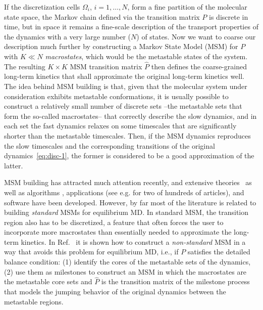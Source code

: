 \documentclass[journal=jctcce,manuscript=article]{achemso}
\newcommand{\vect}[1]{#1}
\begin{document}
If the discretization cells $\Omega_i$, $i=1,\ldots,N$, form a fine
partition of the molecular state space, the Markov chain defined via
the transition matrix $P$
 is discrete in time, but in space it remains a fine-scale description of the transport properties of the
dynamics with a very large number ($N$) of states.  Now we want to coarse our description much further by
constructing a Markov State Model (MSM) for $\vect P$ with $K\ll N$
\emph{macrostates}, which would be the metastable states of the system. The resulting $K\times K$ MSM transition matrix $\hat{\vect P}$
then defines the coarse-grained long-term kinetics that shall
approximate the original long-term kinetics well. 
The idea behind MSM building is that, given that the molecular system under consideration exhibits metastable conformations,  it is usually possible to construct a
relatively small number of discrete sets --the metastable sets that form the so-called macrostates-- that
correctly describe the slow  dynamics, and 
in each set the fast dynamics relaxes on some timescales that are significantly shorter than the metastable timescales.
Then, if the MSM dynamics reproduces the slow timescales and the corresponding transitions
of the original dynamics~\eqref{eq:disc-1},
the former is considered to be a good approximation of the latter.

MSM building has attracted much attention recently, and extensive theories~\cite{A19-31} as well as algorithms \cite{A19-1}, applications (see e.g. \cite{A19-26,PNAS09} for two of hundreds of articles), and software \cite{A19-49, MSMBuilder} have been developed. However, 
by far most of the literature is related to building \emph{standard} MSMs for equilibrium MD. In standard MSM, the transition region also has to be discretized, a feature that often forces the user to incorporate more macrostates than essentially needed to approximate the long-term kinetics.
In Ref.~\cite{sarich2010approximation, A19-31,schuette2011markov,BucheteHummer} it is shown how to construct a \emph{non-standard} MSM in a way that avoids this problem for equilibrium MD, i.e., if $\vect P$ satisfies the detailed balance
condition: (1) identify the cores of the metastable sets of the
dynamics, (2) use them as milestones to construct an MSM in which the
macrostates are the metastable core sets and $\hat{\vect P}$ is the transition
matrix of the milestone process \cite{A19-31,schuette2011markov,A19-29} that models the jumping behavior of
the original dynamics between the metastable regions. 
\end{document}
